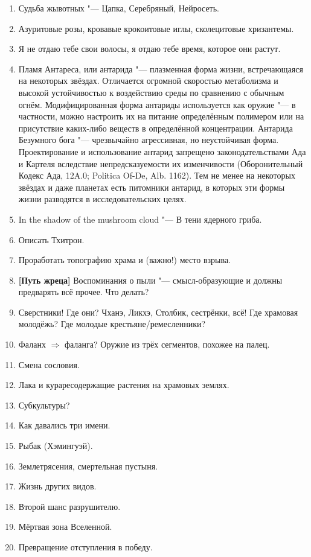 \documentclass[a4paper,10pt]{book}
\begin{document}
\begin{enumerate}
\item Судьба жывотных "--- Цапка, Серебряный, Нейросеть.
\item Азуритовые розы, кровавые крокоитовые иглы, сколецитовые хризантемы.
\item Я не отдаю тебе свои волосы, я отдаю тебе время, которое они растут.
\item Пламя Антареса, или антарида "--- плазменная форма жизни, встречающаяся 
на 
некоторых звёздах. Отличается огромной скоростью метаболизма и высокой 
устойчивостью к воздействию среды по сравнению с обычным огнём. 
Модифицированная 
форма антариды используется как оружие "--- в частности, можно настроить их на 
питание определённым полимером или на присутствие каких-либо веществ в 
определённой концентрации. Антарида Безумного бога "--- чрезвычайно 
агрессивная, 
но неустойчивая форма. Проектирование и использование антарид запрещено 
законодательствами Ада и Картеля вследствие непредсказуемости их изменчивости 
(Оборонительный Кодекс Ада, 12A.0; Politica Of-De, Alb. 1162). Тем не менее на 
некоторых звёздах и даже планетах есть питомники антарид, в которых эти формы 
жизни разводятся в исследовательских целях.
\item In the shadow of the mushroom cloud "--- В тени ядерного гриба.
\item Описать Тхитрон.
\item Проработать топографию храма и (важно!) место взрыва.
\item \textbf{[Путь жреца]} Воспоминания о пыли "--- смысл-образующие и должны 
предварять всё прочее. Что делать?
\item Сверстники! Где они? Чханэ, Ликхэ, Столбик, сестрёнки, всё! Где храмовая 
молодёжь? Где молодые крестьяне/ремесленники?
\item Фаланх $\Longrightarrow$ фаланга? Оружие из трёх сегментов, похожее на 
палец.
\item Смена сословия.
\item Лака и кураресодержащие растения на храмовых землях.
\item Субкультуры?
\item Как давались три имени.
\item Рыбак (Хэмингуэй).
\item Землетрясения, смертельная пустыня.
\item Жизнь других видов.
\item Второй шанс разрушителю.
\item Мёртвая зона Вселенной.
\item Превращение отступления в победу.

\end{enumerate}
\end{document}
